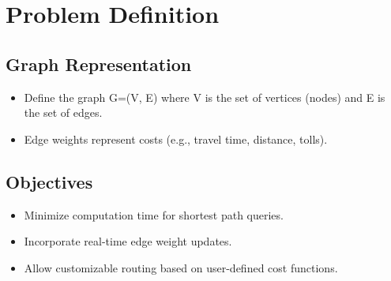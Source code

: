 \chapter{Problem Definition}

\section{Graph Representation}
	\begin{itemize}
		\item Define the graph G=(V, E) where V is the set of vertices (nodes) and E is the set of edges.
		\item Edge weights represent costs (e.g., travel time, distance, tolls).
	\end{itemize}
\section{Objectives}
	\begin{itemize}
		\item Minimize computation time for shortest path queries.
		\item Incorporate real-time edge weight updates.
		\item Allow customizable routing based on user-defined cost functions.
	\end{itemize}
